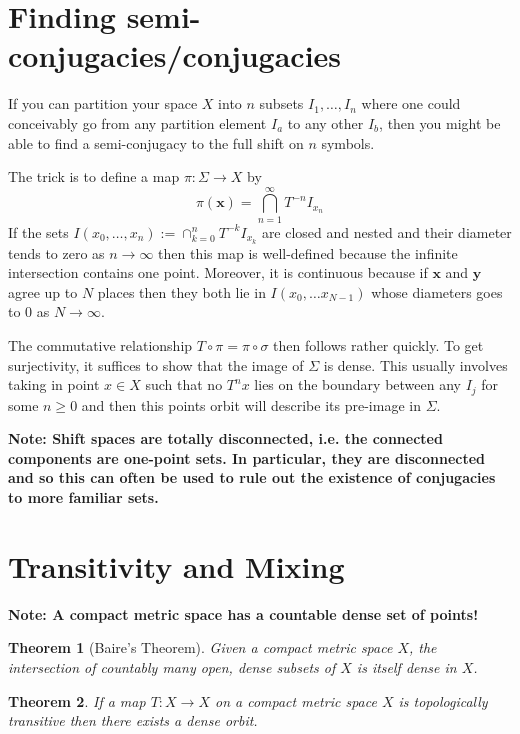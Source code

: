 \documentclass[11pt]{article}
\newcommand{\defeq}{:=}
\newcommand{\mv}[1]{\textbf{#1}}
\newcommand{\mdf}[1]{{\color{Green} #1}}
\newenvironment{note}
	{\begin{mdframed}[backgroundcolor=white, linecolor=red, roundcorner=5pt, linewidth=1pt]\bfseries{Note:}\normalfont
	\setlength{\parindent}{0pt}}
	{\end{mdframed}}
\newtheorem{theorem}{Theorem}[section]
\begin{document}
\section{Finding semi-conjugacies/conjugacies}
If you can partition your space $X$ into $n$ subsets $I_1, \dots, I_n$ where one could conceivably go from any partition element $I_a$ to any other $I_b$, then you might be able to find a semi-conjugacy to the full shift on $n$ symbols.

The trick is to define a map $\pi:\Sigma\to X$ by
\[
	\pi(\mv{x})=\bigcap_{n=1}^\infty T^{-n}I_{x_n}
\]
If the sets $I(x_0, \dots, x_n)\defeq\cap_{k=0}^n T^{-k}I_{x_k}$ are closed and nested and their diameter tends to zero as $n\to \infty$ then this map is well-defined because the infinite intersection contains one point.
Moreover, it is continuous because if $\mv{x}$ and $\mv{y}$ agree up to $N$ places then they both lie in $I(x_0, \dots x_{N-1})$ whose diameters goes to $0$ as $N\to\infty$.

The commutative relationship $T\circ\pi=\pi\circ\sigma$ then follows rather quickly.
To get surjectivity, it suffices to show that the image of $\Sigma$ is dense.
This usually involves taking in point $x\in X$ such that no $T^n x$ lies on the boundary between any $I_j$ for some $n\geq 0$ and then this points orbit will describe its pre-image in $\Sigma$.

\begin{note}
	Shift spaces are \mdf{totally disconnected}, i.e. the connected components are one-point sets.
	In particular, they are disconnected and so this can often be used to rule out the existence of conjugacies to more familiar sets.
\end{note}



\section{Transitivity and Mixing}
\begin{note}
A compact metric space has a countable dense set of points!
\end{note}

\begin{theorem}[Baire's Theorem]
Given a compact metric space $X$, the intersection of countably many open, dense subsets of $X$ is itself dense in $X$.
\end{theorem}

\begin{theorem}
If a map $T:X\to X$ on a compact metric space $X$ is topologically transitive then there exists a dense orbit.
\end{theorem}
\end{document}
